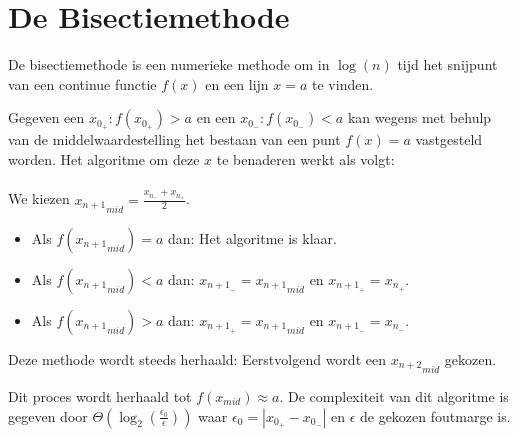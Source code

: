 \chapter{De Bisectiemethode}\label{sec:bisectiemethode}
De bisectiemethode is een numerieke methode om in \(\log(n)\) tijd het snijpunt van een continue functie \(f(x)\) en een lijn \(x=a\) te vinden.

Gegeven een \(x_{0_+}:f(x_{0_+})>a\) en een \(x_{0_-}:f(x_{0_-})<a\) kan wegens met behulp van de middelwaardestelling het bestaan van een punt \(f(x)=a\) vastgesteld worden. Het algoritme om deze \(x\) te benaderen werkt als volgt:\\
\\
We kiezen \({x_{n+1}}_{mid}=\frac{x_{n_-}+x_{n_+}}{2}\).
\begin{itemize}
	\item[] Als \(f({x_{n+1}}_{mid}) = a\) dan: Het algoritme is klaar.
	\item[] Als \(f({x_{n+1}}_{mid}) < a\) dan: \(x_{{n+1}_-} = {x_{n+1}}_{mid}\) en \(x_{{n+1}_+} = x_{n_+}\).
	\item[] Als \(f({x_{n+1}}_{mid}) > a\) dan: \(x_{{n+1}_+} = {x_{n+1}}_{mid}\) en \(x_{{n+1}_-} = x_{n_-}\).
\end{itemize}
Deze methode wordt steeds herhaald: Eerstvolgend wordt een \({x_{n+2}}_{mid}\) gekozen.

Dit proces wordt herhaald tot \(f(x_{mid}) \approx a\). De complexiteit van dit algoritme is gegeven door \(\Theta(\log_2(\frac{\epsilon_0}{\epsilon}))\) waar \(\epsilon_0=|x_{0_+}-x_{0_-}|\) en \(\epsilon\) de gekozen foutmarge is.

